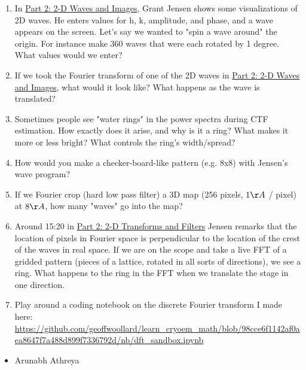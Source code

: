 \documentclass[11pt, oneside]{article}   	%
\begin{document}
\begin{enumerate}
	\item In \href{https://youtu.be/nyk75ufbP74}{Part 2: 2-D Waves and Images}, Grant Jensen shows some visualizations of 2D waves. He enters values for h, k, amplitude, and phase, and a wave appears on the screen. Let's say we wanted to "spin a wave around" the origin. For instance make 360 waves that were each rotated by 1 degree. What values would we enter?
	\item If we took the Fourier transform of one of the 2D waves in \href{https://youtu.be/nyk75ufbP74}{Part 2: 2-D Waves and Images}, what would it look like? What happens as the wave is translated?
	\item Sometimes people see "water rings" in the power spectra during CTF estimation. How exactly does it arise, and why is it a ring? What makes it more or less bright? What controls the ring's width/spread?
	\item How would you make a checker-board-like pattern (e.g. 8x8) with Jensen's wave program?
	\item If we Fourier crop (hard low pass filter) a 3D map (256 pixels, $1 \AA$ / pixel) at $8 \AA$, how many "waves" go into the map?
	\item Around 15:20 in \href{https://youtu.be/fEyLh9HqsWU?t=920s}{Part 2: 2-D Transforms and Filters} Jensen remarks that the location of pixels in Fourier space is perpendicular to the location of the crest of the waves in real space. If we are on the scope and take a live FFT of a gridded pattern (pieces of a lattice, rotated in all sorts of directions), we see a ring. What happens to the ring in the FFT when we translate the stage in one direction.
	\item Play around a coding notebook on the discrete Fourier transform I made here: \url{https://github.com/geoffwoollard/learn_cryoem_math/blob/98cce6f1142af0aea8647f7a488d899f7336792d/nb/dft_sandbox.ipynb}
\end{enumerate}
\begin{itemize}
	\item Arunabh Athreya 
\end{itemize}
\end{document}
